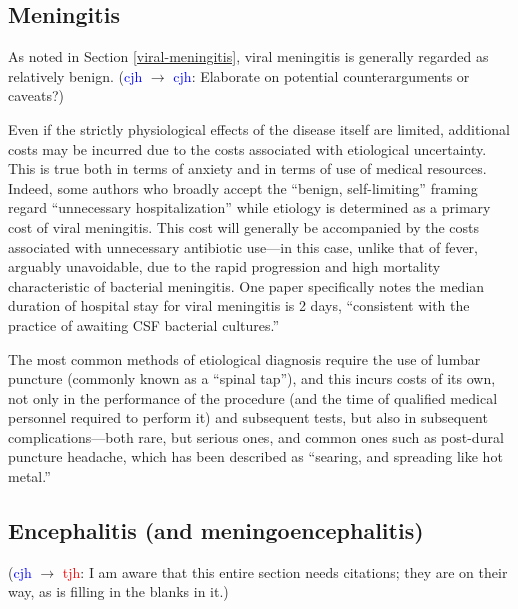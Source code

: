 \documentclass[12pt]{article}
\newcommand{\cjh}{\textcolor{blue}{cjh}}
\newcommand{\tjh}{\textcolor{red}{tjh}}
\newcommand{\msg}[3]{(#1 $\rightarrow$ #2: #3)}
\newcommand{\mcc}[1]{\msg\cjh\cjh{#1}}
\newcommand{\mct}[1]{\msg\cjh\tjh{#1}}
\begin{document}
        \subsection{Meningitis}
            \label{cost-meningitis}
            As noted in Section \ref{viral-meningitis}, viral meningitis is generally regarded as relatively benign. \mcc{Elaborate on potential counterarguments or caveats?}

            Even if the strictly physiological effects of the disease itself are limited, additional costs may be incurred due to the costs associated with etiological uncertainty. This is true both in terms of anxiety and in terms of use of medical resources. Indeed, some authors who broadly accept the ``benign, self-limiting'' framing regard ``unnecessary hospitalization'' while etiology is determined as a primary cost of viral meningitis\cite{balada2019cost}. This cost will generally be accompanied by the costs associated with unnecessary antibiotic use---in this case, unlike that of fever, arguably unavoidable, due to the rapid progression and high mortality characteristic of bacterial meningitis. One paper\cite{hasbun2019epidemiology} specifically notes the median duration of hospital stay for viral meningitis is 2 days, ``consistent with the practice of awaiting CSF bacterial cultures.''

            The most common methods of etiological diagnosis require the use of lumbar puncture (commonly known as a ``spinal tap''), and this incurs costs of its own, not only in the performance of the procedure (and the time of qualified medical personnel required to perform it) and subsequent tests, but also in subsequent complications---both rare, but serious ones, and common ones such as post-dural puncture headache, which has been described as ``searing, and spreading like hot metal.''\cite{weir2000sharp}

        \subsection{Encephalitis (and meningoencephalitis)}
            \label{cost-encephalitis}
            \mct{I am aware that this entire section needs citations; they are on their way, as is filling in the blanks in it.}
\end{document}
